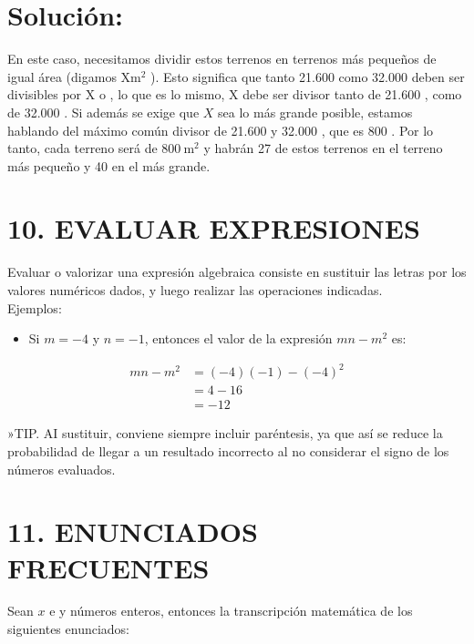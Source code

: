 \documentclass[10pt]{article}
\begin{document}
\section*{Solución:}
En este caso, necesitamos dividir estos terrenos en terrenos más pequeños de igual área (digamos $\mathrm{X} \mathrm{m}^{2}$ ). Esto significa que tanto 21.600 como 32.000 deben ser divisibles por X o , lo que es lo mismo, X debe ser divisor tanto de 21.600 , como de 32.000 . Si además se exige que $X$ sea lo más grande posible, estamos hablando del máximo común divisor de 21.600 y 32.000 , que es 800 . Por lo tanto, cada terreno será de $800 \mathrm{~m}^{2}$ y habrán 27 de estos terrenos en el terreno más pequeño y 40 en el más grande.

\section*{10. EVALUAR EXPRESIONES}
Evaluar o valorizar una expresión algebraica consiste en sustituir las letras por los valores numéricos dados, y luego realizar las operaciones indicadas.\\
Ejemplos:

\begin{itemize}
  \item Si $m=-4$ y $n=-1$, entonces el valor de la expresión $m n-m^{2}$ es:
\end{itemize}

$$
\begin{aligned}
m n-m^{2} & =(-4)(-1)-(-4)^{2} \\
& =4-16 \\
& =-12
\end{aligned}
$$

»TIP. AI sustituir, conviene siempre incluir paréntesis, ya que así se reduce la probabilidad de llegar a un resultado incorrecto al no considerar el signo de los números evaluados.

\section*{11. ENUNCIADOS FRECUENTES}
Sean $x$ e y números enteros, entonces la transcripción matemática de los siguientes enunciados:
\end{document}
